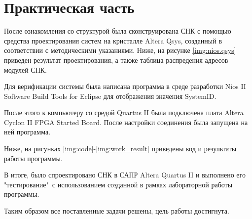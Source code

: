 
\section{Практическая часть}

После ознакомления со структурой была сконструирована СНК с помощью средства проектирования систем на кристалле Altera Qsys, созданный в соответствии с методическими указаниями. Ниже, на рисунке \ref{img:nios.qsys} приведен результат проектирования, а также таблица распредения адресов модулей СНК.




\newpage
Для верификации системы была написана программа в среде разработки Nios II Software Build Tools for Eclipse для отображения значения SystemID.

После этого к компьютеру со средой Quartus II была подключена плата Altera Cyclon II FPGA Started Board. После настройки соединения была запущена на ней программа.

Ниже, на рисунках \ref{img:code}-\ref{img:work_result} приведены код и результаты работы программы.




В итоге, было спроектировано СНК в САПР Altera Quartus II и выполнено его "тестирование"\ с использованием созданной в рамках лабораторной работы программы.

Таким образом все поставленные задачи решены, цель работы достигнута.